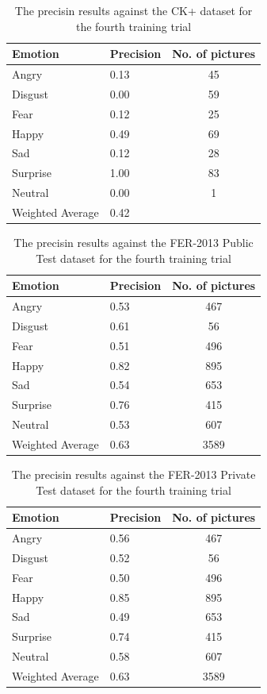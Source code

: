 \documentclass[runningheads,a4paper,11pt]{report}
\begin{document}
\begin{table}[htbp]
	\caption{The precisin results against the CK+ dataset for the fourth training trial}
	\label{fer_training_28k_001_mean_square_ckp}
		\begin{center}
			\begin{tabular}{p{110pt}p{110pt}c}
				\textbf{Emotion}& \textbf{Precision}& \textbf{No. of pictures} \\
				\hline\hline
				Angry& 0.13& 45 \\
				Disgust& 0.00& 59 \\
				Fear& 0.12& 25 \\
				Happy& 0.49& 69 \\
				Sad& 0.12& 28 \\
				Surprise& 1.00& 83 \\
				Neutral& 0.00& 1 \\
				\hline
				Weighted Average& 0.42
			\end{tabular}
		\end{center}
\end{table}
\begin{table}[htbp]
	\caption{The precisin results against the FER-2013 Public Test dataset for the fourth training trial}
	\label{fer_training_28k_001_mean_square_public_test}
		\begin{center}
			\begin{tabular}{p{110pt}p{110pt}c}
				\textbf{Emotion}& \textbf{Precision}& \textbf{No. of pictures} \\
				\hline\hline
				Angry& 0.53& 467 \\
				Disgust& 0.61& 56 \\
				Fear& 0.51& 496 \\
				Happy& 0.82& 895 \\
				Sad& 0.54& 653 \\
				Surprise& 0.76& 415 \\
				Neutral& 0.53& 607 \\
				\hline
				Weighted Average& 0.63 &3589
			\end{tabular}
		\end{center}
\end{table}
\begin{table}[htbp]
	\caption{The precisin results against the FER-2013 Private Test dataset for the fourth training trial}
	\label{fer_training_28k_001_mean_square_private_test}
		\begin{center}
			\begin{tabular}{p{110pt}p{110pt}c}
				\textbf{Emotion}& \textbf{Precision}& \textbf{No. of pictures} \\
				\hline\hline
				Angry& 0.56& 467 \\
				Disgust& 0.52& 56 \\
				Fear& 0.50& 496 \\
				Happy& 0.85& 895 \\
				Sad& 0.49& 653 \\
				Surprise& 0.74& 415 \\
				Neutral& 0.58& 607 \\
				\hline
				Weighted Average& 0.63 &3589
			\end{tabular}
		\end{center}
\end{table}
\end{document}

